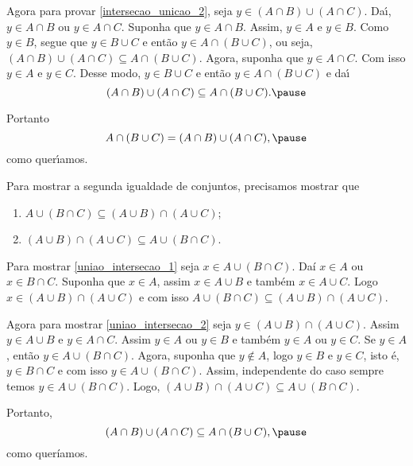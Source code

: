 \documentclass{beamer}
\begin{document}
    \begin{frame}
        Agora para provar \ref{intersecao_unicao_2}, \pause seja $y \in (A \cap B) \cup (A \cap C)$. \pause Da{\'\i}, $y \in A\cap B$ \pause ou $y \in A \cap C$. \pause Suponha que $y \in A \cap B$. \pause Assim, $y \in A$ \pause e $y \in B$. \pause Como $y \in B$, \pause segue que $y \in B \cup C$ \pause e ent{\~a}o $y \in A \cap (B \cup C)$, \pause ou seja, $(A \cap B) \cup (A \cap C) \subseteq A \cap (B \cup C)$. \pause Agora, suponha que $y \in A \cap C$. \pause Com isso $y \in A$ \pause e $y \in C$. \pause Desse modo, $y \in B \cup C$ \pause e ent{\~a}o $y \in A \cap (B \cup C)$ \pause e da{\'\i}\pause
        \[
            (A \cap B) \cup (A \cap C) \subseteq A \cap (B \cup C).\pause
        \]

        Portanto
        \[
            A \cap (B \cup C)=(A \cap B) \cup (A \cap C),\pause
        \]
        como quer{\'\i}amos.
    \end{frame}
    \begin{frame}
        Para mostrar a segunda igualdade de conjuntos, precisamos mostrar que\pause
        \begin{enumerate}[label=({\arabic*})]
            \item $A \cup (B \cap C) \subseteq (A \cup B) \cap (A \cup C)$;\label{uniao_intersecao_1}\pause
            \item $(A \cup B) \cap (A \cup C) \subseteq A \cup (B \cap C)$.\label{uniao_intersecao_2}\pause
        \end{enumerate}

        Para mostrar \ref{uniao_intersecao_1} seja $x \in A \cup (B \cap C)$. \pause Daí $x \in A$ \pause ou $x \in B \cap C$. \pause Suponha que $x \in A$, \pause assim $x \in A \cup B$ \pause e também $x \in A \cup C$. Logo $x \in (A \cup B) \cap (A \cup C)$ \pause e com isso $A \cup (B \cap C) \subseteq (A \cup B) \cap (A \cup C)$.\pause

        Agora para mostrar \ref{uniao_intersecao_2} seja $y \in (A \cup B) \cap (A \cup C)$. \pause Assim $y \in A \cup B$ \pause e $y \in A \cap C$. \pause Assim $y \in A$ \pause ou $y \in B$ \pause e também $y \in A$ \pause ou $y \in C$. \pause Se $y \in A$, \pause então $y \in A \cup (B \cap C)$. Agora, suponha que $y \notin A$, \pause logo $y \in B$ e $y \in C$, \pause isto é, $y \in B \cap C$ e com isso $y \in A \cup (B \cap C)$. Assim, \pause independente do caso sempre temos $y \in A \cup (B \cap C)$. \pause Logo, $(A \cup B) \cap (A \cup C) \subseteq A \cup (B \cap C)$.\pause

        Portanto,\pause
        \[
            (A\cap B)\cup(A\cap C)\subseteq A\cap(B\cup C),\pause
        \]
        como queríamos. \qedsymbol \pause 
    \end{frame}
\end{document}
